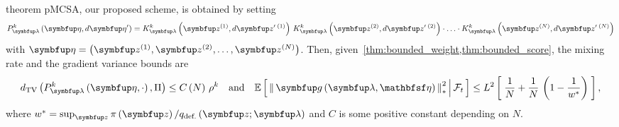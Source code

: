
\begin{theoremEnd}{theorem}\label{thm:pmcsa}
  pMCSA, our proposed scheme, is obtained by setting
  {%
  \begin{align*}
    P_{\vlambda}^k\left(\veta, d\veta^{\prime}\right)
    = 
    K_{\vlambda}^k\left(\vz^{(1)}, d\vz^{\prime\; (1)}\right)
    \,
    K_{\vlambda}^k\left(\vz^{(2)}, d\vz^{\prime\; (2)}\right)
    \cdot
    \ldots 
    \cdot
    K_{\vlambda}^k\left(\vz^{(N)}, d\vz^{\prime\; (N)}\right)
  \end{align*}
  }
  with \(\veta = \left(\vz^{(1)}, \vz^{(2)}, \ldots, \vz^{(N)}\right)\).
  Then, given~\cref{thm:bounded_weight,thm:bounded_score}, the mixing rate and the gradient variance bounds are
  {%
  \begin{align*}
    \DTV{P_{\vlambda}^k\left(\veta, \cdot\right)}{\Pi}
    \leq
    C\left(N\right)\,{\rho^k}
    \quad\text{and}\quad
    \E{ \norm{ \vg\left(\vlambda, \rvveta\right) }^2_{*} \,\middle|\, \mathcal{F}_{t} }
    \leq
    L^2 \left[\; \frac{1}{N} + \frac{1}{N}\,\left(1 - \frac{1}{w^*}\right) \;\right],
  \end{align*}
  }
  where \(w^* = \sup_{\vz} \pi\left(\vz\right) / q_{\text{def.}}\left(\vz;\vlambda\right)\) and \(C\) is some positive constant depending on \(N\).
\end{theoremEnd}
